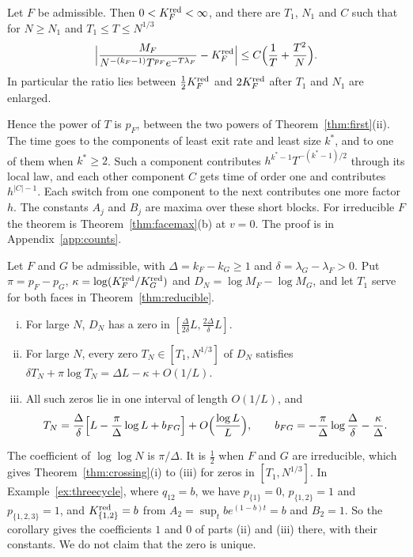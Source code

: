 \begin{theorem}\label{thm:reducible}
Let $F$ be admissible. Then $0<K^{\rm red}_F<\infty$, and there are $T_1$, $N_1$ and $C$ such that
for $N\ge N_1$ and $T_1\le T\le N^{1/3}$
\[
\Bigl|\frac{M_F}{N^{-(k_F-1)}T^{p_F}e^{-T\lambda_F}}-K^{\rm red}_F\Bigr|\le C\Bigl(\frac1T+\frac{T^2}N\Bigr).
\]
In particular the ratio lies between $\frac12K^{\rm red}_F$ and $2K^{\rm red}_F$ after $T_1$ and
$N_1$ are enlarged.
\end{theorem}

Hence the power of $T$ is $p_F$, between the two powers of Theorem~\ref{thm:first}(ii). The time
goes to the components of least exit rate and least size $k^*$, and to one of them when
$k^*\ge2$. Such a component contributes $h^{k^*-1}T^{-(k^*-1)/2}$ through its local law, and each
other component $C$ gets time of order one and contributes $h^{|C|-1}$. Each switch from one component to the next contributes
one more factor $h$. The constants $A_j$ and $B_j$ are maxima over these short blocks.
For irreducible $F$ the theorem is Theorem~\ref{thm:facemax}(b) at $v=0$. The proof is in
Appendix~\ref{app:counts}.

\begin{corollary}\label{cor:reducible-crossing}
Let $F$ and $G$ be admissible, with $\Delta=k_F-k_G\ge1$ and $\delta=\lambda_G-\lambda_F>0$. Put
$\pi=p_F-p_G$, $\kappa=\log(K^{\rm red}_F/K^{\rm red}_G)$ and $D_N=\log M_F-\log M_G$, and let
$T_1$ serve for both faces in Theorem~\ref{thm:reducible}.
\begin{enumerate}[(i)]
\item For large $N$, $D_N$ has a zero in $[\frac\Delta{2\delta}L,\frac{2\Delta}\delta L]$.
\item For large $N$, every zero $T_N\in[T_1,N^{1/3}]$ of $D_N$ satisfies
$\delta T_N+\pi\log T_N=\Delta L-\kappa+O(1/L)$.
\item All such zeros lie in one interval of length $O(1/L)$, and
\[
T_N=\frac\Delta\delta\Bigl[L-\frac\pi\Delta\log L+b_{FG}\Bigr]+O\Bigl(\frac{\log L}L\Bigr),\qquad
b_{FG}=-\frac\pi\Delta\log\frac\Delta\delta-\frac\kappa\Delta .
\]
\end{enumerate}
\end{corollary}

The coefficient of $\log\log N$ is $\pi/\Delta$. It is $\frac12$ when $F$ and $G$ are
irreducible, which gives Theorem~\ref{thm:crossing}(i) to (iii) for zeros in $[T_1,N^{1/3}]$. In
Example~\ref{ex:threecycle}, where $q_{12}=b$, we have $p_{\{1\}}=0$, $p_{\{1,2\}}=1$ and $p_{\{1,2,3\}}=1$, and
$K^{\rm red}_{\{1,2\}}=b$ from $A_2=\sup_tbe^{(1-b)t}=b$ and $B_2=1$. So the corollary gives the
coefficients $1$ and $0$ of parts (ii) and (iii) there, with their constants. We do not claim
that the zero is unique.
